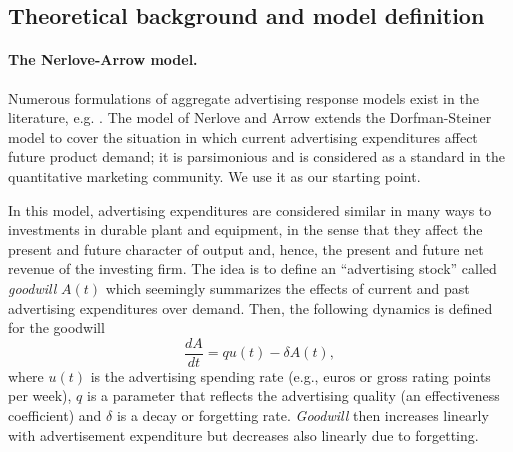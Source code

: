 


\subsection{Theoretical background and model definition}\label{sec:nerlove}


\paragraph{The Nerlove-Arrow model.}


Numerous formulations of aggregate advertising response models exist in the  literature, e.g. \parencite{little1979aggregate}. The model of Nerlove and Arrow \parencite{nerlove1962optimal} extends the Dorfman-Steiner model to cover the situation in which current advertising expenditures affect future product demand; it is parsimonious and is considered as a standard in the quantitative marketing community. We use it as our starting point.

In this model, advertising expenditures are considered similar in many ways to investments in durable plant and equipment, in the sense that they affect the present and future character of output and, hence, the present and future net revenue of the investing firm. The idea is to define an ``advertising stock'' called \emph{goodwill}  $A(t)$ which seemingly summarizes the effects of current and past advertising expenditures over demand. Then, the following dynamics is defined for the goodwill
\begin{equation}\label{eq:NA}
\frac{dA}{dt} = qu(t) - \delta A(t),
\end{equation}
where $u(t)$ is the advertising spending rate (e.g., euros or gross rating points per week), $q$ is a parameter that reflects the advertising quality (an effectiveness coefficient) and $\delta$ is a decay or forgetting rate. \emph{Goodwill} then increases linearly with  advertisement expenditure but decreases also linearly due to forgetting. %

